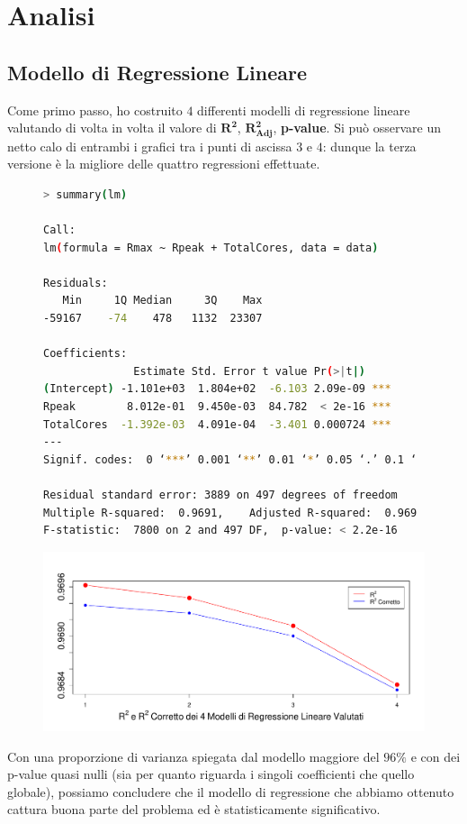 \documentclass[11pt,a4paper]{article}
\begin{document}
\section{Analisi}
\subsection{Modello di Regressione Lineare}
Come primo passo, ho costruito $4$ differenti modelli di regressione lineare
valutando di volta in volta il valore di $\boldsymbol{R^2}$,
$\boldsymbol{R^2_{Adj}}$, \textbf{p-value}. Si pu\`o osservare un netto calo di
entrambi i grafici tra i punti di ascissa $3$ e $4$: dunque la terza versione
\`e la migliore delle quattro regressioni effettuate.
\begin{figure}[h]
	\hspace{-2.15cm}
	\begin{minipage}{.6\textwidth} 
		\begin{lstlisting}[language=bash,basicstyle=\tiny,tabsize=2,frame = single]
> summary(lm)

Call:
lm(formula = Rmax ~ Rpeak + TotalCores, data = data)

Residuals:
   Min     1Q Median     3Q    Max 
-59167    -74    478   1132  23307 

Coefficients:
              Estimate Std. Error t value Pr(>|t|)    
(Intercept) -1.101e+03  1.804e+02  -6.103 2.09e-09 ***
Rpeak        8.012e-01  9.450e-03  84.782  < 2e-16 ***
TotalCores  -1.392e-03  4.091e-04  -3.401 0.000724 ***
---
Signif. codes:  0 ‘***’ 0.001 ‘**’ 0.01 ‘*’ 0.05 ‘.’ 0.1 ‘ ’ 1

Residual standard error: 3889 on 497 degrees of freedom
Multiple R-squared:  0.9691,	Adjusted R-squared:  0.969 
F-statistic:  7800 on 2 and 497 DF,  p-value: < 2.2e-16
		\end{lstlisting}
	\end{minipage}
	\begin{minipage}{0.5\textwidth} 
		\includegraphics[scale=.4]{imgs/r_squared.pdf}
	\end{minipage}
\end{figure}
Con una proporzione di varianza spiegata dal modello maggiore del $96\%$ e con
dei p-value quasi nulli (sia per quanto riguarda i singoli coefficienti che
quello globale), possiamo concludere che il modello di regressione che abbiamo
ottenuto cattura buona parte del problema ed \`e statisticamente significativo.
\end{document}
